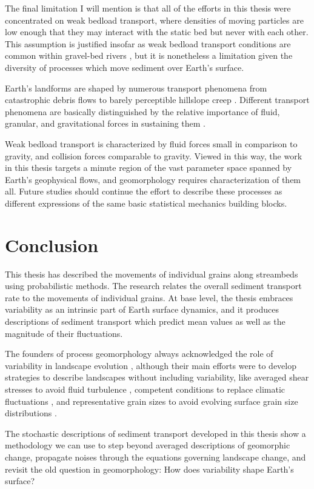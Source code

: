 The final limitation I will mention is that all of the efforts in this thesis were concentrated on weak bedload transport, where densities of moving particles are low enough that they may interact with the static bed but never with each other. This assumption is justified insofar as weak bedload transport conditions are common within gravel-bed rivers \citep{Ashworth1989,Warburton1992}, but it is nonetheless a limitation given the diversity of processes which move sediment over Earth's surface.

Earth's landforms are shaped by numerous transport phenomena from catastrophic debris flows \citep{Iverson1997} to barely perceptible hillslope creep \citep{Deshpande2021}.
Different transport phenomena are basically distinguished by the relative importance of fluid, granular, and gravitational forces in sustaining them \citep{Jerolmack2019}.

Weak bedload transport is characterized by fluid forces small in comparison to gravity, and collision forces comparable to gravity.
Viewed in this way, the work in this thesis targets a minute region of the vast parameter space spanned by Earth's geophysical flows, and geomorphology requires characterization of them all.
Future studies should continue the effort \citep[e.g.][]{Furbish2021a} to describe these processes as different expressions of the same basic statistical mechanics building blocks.

\section{Conclusion}

This thesis has described the movements of individual grains along streambeds using probabilistic methods.
The research relates the overall sediment transport rate to the movements of individual grains.
At base level, the thesis embraces variability as an intrinsic part of Earth surface dynamics, and it produces descriptions of sediment transport which predict mean values as well as the magnitude of their fluctuations.

The founders of process geomorphology always acknowledged the role of variability in landscape evolution \citep{Horton1945,Strahler1952,Langbein1964}, although their main efforts were to develop strategies to describe landscapes without including variability, like averaged shear stresses to avoid fluid turbulence \citep{MeyerPeter1948,Bagnold1954}, competent conditions to replace climatic fluctuations \citep{Wolman1959,Wolman1978}, and representative grain sizes to avoid evolving surface grain size distributions \citep{Parker1982,Andrews1983}.

The stochastic descriptions of sediment transport developed in this thesis show a methodology we can use to step beyond averaged descriptions of geomorphic change, propagate noises through the equations governing landscape change, and revisit the old question in geomorphology: How does variability shape Earth's surface?

